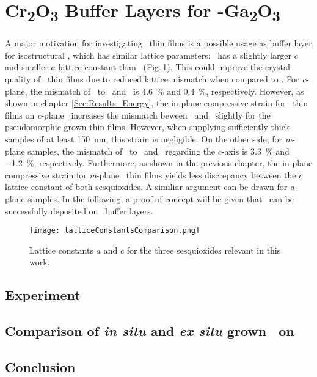 \section{\texorpdfstring{C\lowercase{r}\textsubscript{2}O\textsubscript{3}}{Cr2O3} Buffer Layers for \texorpdfstring{\textalpha-G\lowercase{a}\textsubscript{2}O\textsubscript{3}}{a-Ga2O3}}
    \label{Sec:Results_Buffer}

A major motivation for investigating \cro\ thin films is a possible usage as buffer layer for isostructural \agao, which has similar lattice parameters:
\cro\ has a slightly larger $c$ and smaller $a$ lattice constant than \agao\ (Fig.\,\ref{Fig:Results_4_LatticeConstantsComp}).
This could improve the crystal quality of \agao\ thin films due to reduced lattice mismatch when compared to 
    \cite{stepanov2021}.
For \textit{c}-plane, the mismatch of \agao\ to \alo\ and \cro\ is \qty{4.6}{\percent} and \qty{0.4}{\percent}, respectively.
However, as shown in chapter \ref{Sec:Results_Energy}, the in-plane compressive strain for \cro\ thin films on \textit{c}-plane \alo\ increases the mismatch beween \cro\ and \agao\ slightly for the pseudomorphic grown thin films.
However, when supplying sufficiently thick samples of at least \qty{150}{\nm}, this strain is negligible.
On the other side, for \textit{m}-plane samples, the mismatch of \agao\ to \alo\ and \cro\ regarding the $c$-axis is \qty{3.3}{\percent} and \qty{-1.2}{\percent}, respectively.
Furthermore, as shown in the previous chapter, the in-plane compressive strain for \textit{m}-plane \cro\ thin films yields less discrepancy between the $c$ lattice constant of both sesquioxides.
A similiar argument can be drawn for \textit{a}-plane samples.
In the following, a proof of concept will be given that \agao\ can be successfully deposited on \cro\ buffer layers.
\begin{figure}[b]
    \centering
    \texttt{[image: latticeConstantsComparison.png]}
    \caption{Lattice constants $a$ and $c$ for the three sesquioxides relevant in this work.}
    \label{Fig:Results_4_LatticeConstantsComp}
\end{figure}

\subsection{Experiment}
    
\subsection{Comparison of \textit{in situ} and \textit{ex situ} grown \texorpdfstring{\gao}{Ga2O3}\ on \texorpdfstring{\cro}{Cr2O3}}
    
\subsection{Conclusion}
    